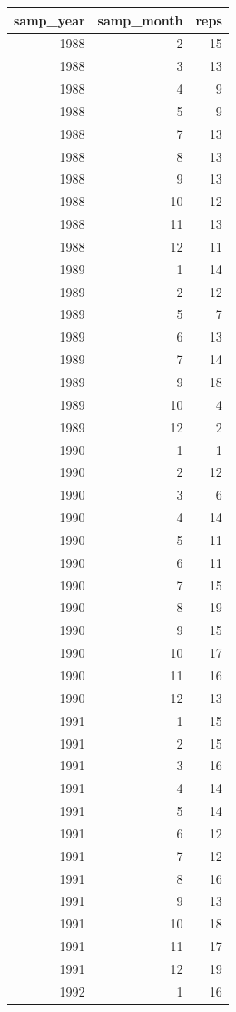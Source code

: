 \documentclass[]{article}
\begin{document}
\begin{tabular}{r|r|r}
\hline
samp\_year & samp\_month & reps\\
\hline
1988 & 2 & 15\\
\hline
1988 & 3 & 13\\
\hline
1988 & 4 & 9\\
\hline
1988 & 5 & 9\\
\hline
1988 & 7 & 13\\
\hline
1988 & 8 & 13\\
\hline
1988 & 9 & 13\\
\hline
1988 & 10 & 12\\
\hline
1988 & 11 & 13\\
\hline
1988 & 12 & 11\\
\hline
1989 & 1 & 14\\
\hline
1989 & 2 & 12\\
\hline
1989 & 5 & 7\\
\hline
1989 & 6 & 13\\
\hline
1989 & 7 & 14\\
\hline
1989 & 9 & 18\\
\hline
1989 & 10 & 4\\
\hline
1989 & 12 & 2\\
\hline
1990 & 1 & 1\\
\hline
1990 & 2 & 12\\
\hline
1990 & 3 & 6\\
\hline
1990 & 4 & 14\\
\hline
1990 & 5 & 11\\
\hline
1990 & 6 & 11\\
\hline
1990 & 7 & 15\\
\hline
1990 & 8 & 19\\
\hline
1990 & 9 & 15\\
\hline
1990 & 10 & 17\\
\hline
1990 & 11 & 16\\
\hline
1990 & 12 & 13\\
\hline
1991 & 1 & 15\\
\hline
1991 & 2 & 15\\
\hline
1991 & 3 & 16\\
\hline
1991 & 4 & 14\\
\hline
1991 & 5 & 14\\
\hline
1991 & 6 & 12\\
\hline
1991 & 7 & 12\\
\hline
1991 & 8 & 16\\
\hline
1991 & 9 & 13\\
\hline
1991 & 10 & 18\\
\hline
1991 & 11 & 17\\
\hline
1991 & 12 & 19\\
\hline
1992 & 1 & 16\\
\hline
\end{tabular}
\end{document}
